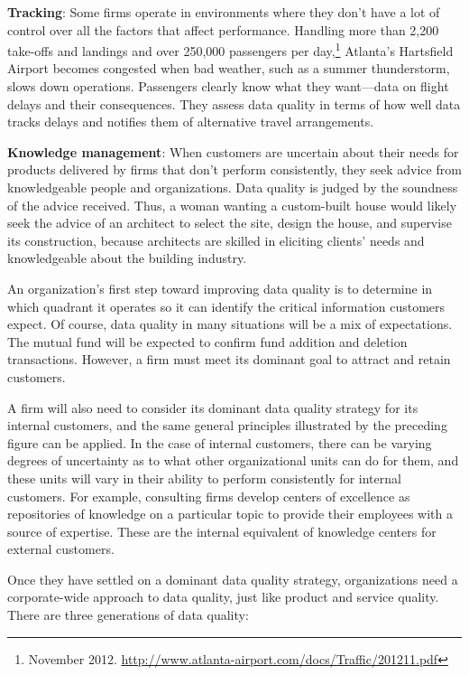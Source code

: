 \documentclass[
]{article}
\begin{document}
\textbf{Tracking}: Some firms operate in environments where they don't have a
lot of control over all the factors that affect performance. Handling
more than 2,200 take-offs and landings and over 250,000 passengers per
day,\footnote{November 2012.
  \href{http://www.atlanta-airport.com/docs/Traffic/201211.pdf\%5D\%7B.underline\%7D\%5D(http://www.atlanta-airport.com/docs/Traffic/201211.pdf)}{http://www.atlanta-airport.com/docs/Traffic/201211.pdf}} Atlanta's Hartsfield Airport becomes congested when bad
weather, such as a summer thunderstorm, slows down operations.
Passengers clearly know what they want---data on flight delays and their
consequences. They assess data quality in terms of how well data tracks
delays and notifies them of alternative travel arrangements.

\textbf{Knowledge management}: When customers are uncertain about their needs
for products delivered by firms that don't perform consistently, they
seek advice from knowledgeable people and organizations. Data quality is
judged by the soundness of the advice received. Thus, a woman wanting a
custom-built house would likely seek the advice of an architect to
select the site, design the house, and supervise its construction,
because architects are skilled in eliciting clients' needs and
knowledgeable about the building industry.

An organization's first step toward improving data quality is to
determine in which quadrant it operates so it can identify the critical
information customers expect. Of course, data quality in many situations
will be a mix of expectations. The mutual fund will be expected to
confirm fund addition and deletion transactions. However, a firm must
meet its dominant goal to attract and retain customers.

A firm will also need to consider its dominant data quality strategy for
its internal customers, and the same general principles illustrated by
the preceding figure can be applied. In the case of internal customers,
there can be varying degrees of uncertainty as to what other
organizational units can do for them, and these units will vary in their
ability to perform consistently for internal customers. For example,
consulting firms develop centers of excellence as repositories of
knowledge on a particular topic to provide their employees with a source
of expertise. These are the internal equivalent of knowledge centers for
external customers.

Once they have settled on a dominant data quality strategy,
organizations need a corporate-wide approach to data quality, just like
product and service quality. There are three generations of data
quality:
\end{document}
